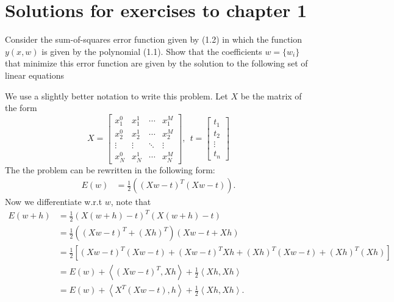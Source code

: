 
\chapter{Solutions for exercises to chapter 1}

\begin{cBoxA}{}
 Consider the sum-of-squares error function given by (1.2) in which
the function $y(x,w)$ is given by the polynomial (1.1). Show that
the coefficients $w=\{w_{i}\}$ that minimize this error function
are given by the solution to the following set of linear equations
\end{cBoxA}

We use a slightly better notation to write this problem. Let $X$
be the matrix of the form 
\[
X=\begin{bmatrix}x_{1}^{0} & x_{1}^{1} & \cdots & x_{1}^{M}\\
x_{2}^{0} & x_{2}^{1} & \cdots & x_{2}^{M}\\
\vdots & \vdots & \ddots & \vdots\\
x_{N}^{0} & x_{N}^{1} & \cdots & x_{N}^{M}
\end{bmatrix},\ \ t=\begin{bmatrix}t_{1}\\
t_{2}\\
\vdots\\
t_{n}
\end{bmatrix}
\]
The the problem can be rewritten in the following form: 
\begin{align*}
E(w) & =\frac{1}{2}\left(\left(Xw-t\right)^{T}\left(Xw-t\right)\right).
\end{align*}
Now we differentiate w.r.t $w$, note that 
\begin{align*}
E(w+h) & =\frac{1}{2}\left(X\left(w+h\right)-t\right)^{T}\left(X\left(w+h\right)-t\right)\\
 & =\frac{1}{2}\left(\left(Xw-t\right)^{T}+\left(Xh\right)^{T}\right)\left(Xw-t+Xh\right)\\
 & =\frac{1}{2}\left[\left(Xw-t\right)^{T}\left(Xw-t\right)+\left(Xw-t\right)^{T}Xh+\left(Xh\right)^{T}\left(Xw-t\right)+\left(Xh\right)^{T}\left(Xh\right)\right]\\
 & =E\left(w\right)+\left\langle \left(Xw-t\right)^{T},Xh\right\rangle +\frac{1}{2}\left\langle Xh,Xh\right\rangle \\
 & =E\left(w\right)+\left\langle X^{T}\left(Xw-t\right),h\right\rangle +\frac{1}{2}\left\langle Xh,Xh\right\rangle .
\end{align*}
